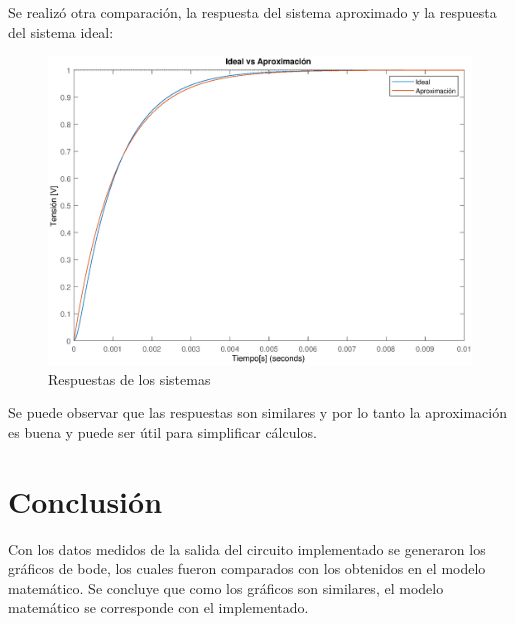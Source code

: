 \documentclass[10pt,a4paper]{article} %
\begin{document}
Se realizó otra comparación, la respuesta del sistema aproximado y la respuesta del sistema ideal:

 \begin{figure}[H]
	\begin{center}
		\includegraphics[scale=0.5]{comp2}
		\caption{Respuestas de los sistemas}
	\end{center}
\end{figure}

Se puede observar que las respuestas son similares y por lo tanto la aproximación es buena y puede ser útil para simplificar cálculos.
 
\section{Conclusión}
Con los datos medidos de la salida del circuito implementado se generaron los gráficos de bode, los cuales fueron comparados con los obtenidos en el modelo matemático. Se concluye que como los gráficos son similares, el modelo matemático se corresponde con el implementado.
\end{document}
